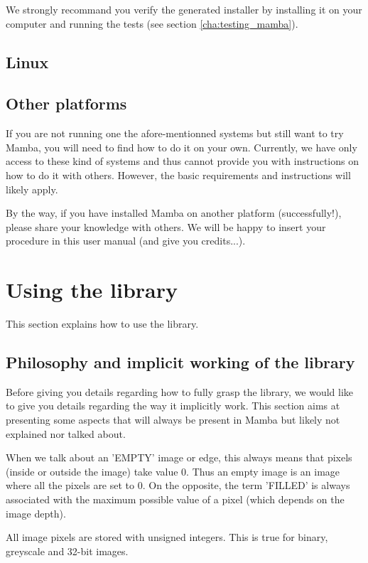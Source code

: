 \documentclass[a4paper,10pt,oneside]{article}
\begin{document}
We strongly recommand you verify the generated installer by installing it on
your computer and running the tests (see section \ref{cha:testing_mamba}).

\subsection{Linux}

\subsection{Other platforms}

If you are not running one the afore-mentionned systems but still want to try
Mamba, you will need to find how to do it on your own. Currently, we have only access to
these kind of systems and thus cannot provide you with instructions on how to do
it with others. However, the basic requirements and instructions will likely apply.

By the way, if you have installed Mamba on another platform (successfully!), please
share your knowledge with others. We will be happy to insert your procedure in this
user manual (and give you credits...).

\pagebreak

\section{Using the library}
\label{cha:using_library}

This section explains how to use the library.

\subsection{Philosophy and implicit working of the library}

Before giving you details regarding how to fully grasp the library, we would
like to give you details regarding the way it implicitly work. This section aims
at presenting some aspects that will always be present in Mamba but likely not 
explained nor talked about.

When we talk about an 'EMPTY' image or edge, this always means that pixels 
(inside or outside the image) take value 0. Thus an empty
image is an image where all the pixels are set to 0. On the opposite, the term 
'FILLED' is always associated with the maximum possible value of a pixel (which
depends on the image depth).

All image pixels are stored with unsigned integers. This is true for binary,
greyscale and 32-bit images.
\end{document}
